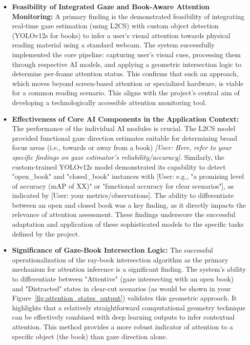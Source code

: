 \begin{itemize}
    \item \textbf{Feasibility of Integrated Gaze and Book-Aware Attention Monitoring:}
    A primary finding is the demonstrated feasibility of integrating real-time gaze estimation (using L2CS) with custom object detection (YOLOv12s for books) to infer a user's visual attention towards physical reading material using a standard webcam. The system successfully implemented the core pipeline: capturing user's visual cues, processing them through respective AI models, and applying a geometric intersection logic to determine per-frame attention status. This confirms that such an approach, which moves beyond screen-based attention or specialized hardware, is viable for a common reading scenario. This aligns with the project's central aim of developing a technologically accessible attention monitoring tool.

    \item \textbf{Effectiveness of Core AI Components in the Application Context:}
    The performance of the individual AI modules is crucial. The L2CS model provided functional gaze direction estimates suitable for determining broad focus areas (i.e., towards or away from a book) \textit{[User: Here, refer to your specific findings on gaze estimator's reliability/accuracy]}. Similarly, the custom-trained YOLOv12s model demonstrated its capability to detect "open\_book" and "closed\_book" instances with [User: e.g., "a promising level of accuracy (mAP of XX)" or "functional accuracy for clear scenarios"], as indicated by [User: your metrics/observations]. The ability to differentiate between an open and closed book was a key finding, as it directly impacts the relevance of attention assessment. These findings underscore the successful adaptation and application of these sophisticated models to the specific tasks defined by the project.

    \item \textbf{Significance of Gaze-Book Intersection Logic:}
    The successful operationalization of the ray-book intersection algorithm as the primary mechanism for attention inference is a significant finding. The system's ability to differentiate between "Attentive" (gaze intersecting with an open book) and "Distracted" states in clear-cut scenarios (as would be shown in your Figure~\ref{fig:attention_states_output}) validates this geometric approach. It highlights that a relatively straightforward computational geometry technique can be effectively combined with deep learning outputs to infer contextual attention. This method provides a more robust indicator of attention to a specific object (the book) than gaze direction alone.


\end{itemize}
